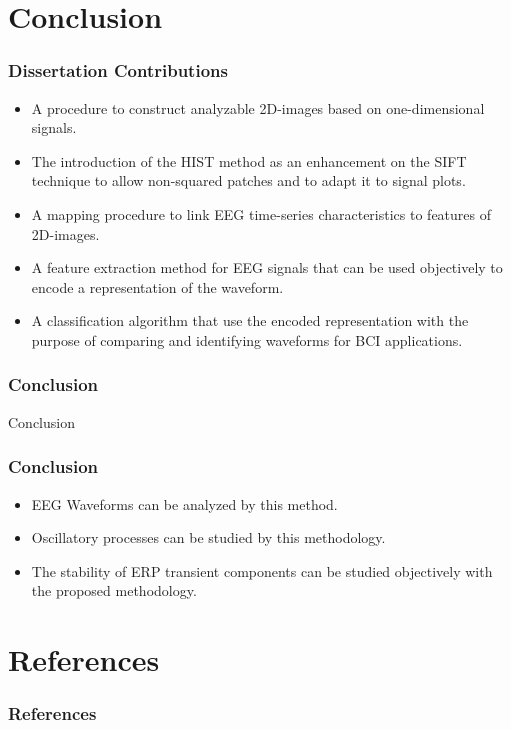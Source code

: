 \documentclass[aspectratio=169]{beamer}
\begin{document}
    \section{Conclusion}
    \begin{frame}
        \frametitle{Dissertation Contributions}
        \begin{center}
            \begin{itemize}
                \item A procedure to construct analyzable 2D-images based on one-dimensional signals.
                \item The introduction of the HIST method as an enhancement on the SIFT technique to allow non-squared patches and to adapt it to signal plots.
                \item A mapping procedure to link EEG time-series characteristics to features of 2D-images.
                \item A feature extraction method for EEG signals that can be used objectively to encode a representation of the waveform.
                \item A classification algorithm that use the encoded representation with the purpose of comparing and identifying waveforms for BCI applications.
            \end{itemize}
        \end{center}
    \end{frame}    


\begin{frame}
\frametitle{Conclusion}
\begin{center}
\LARGE Conclusion
\end{center}
\end{frame}
    
\begin{frame}
\frametitle{Conclusion}
\begin{center}
\begin{itemize}
\item EEG Waveforms can be analyzed by this method.
\item Oscillatory processes can be studied by this methodology.
\item The stability of ERP transient components can be studied objectively with the proposed methodology.
\end{itemize}
\end{center}
\end{frame}    
    
    
    \section{References}
    \begin{frame} %
        \frametitle{References}

    \end{frame}
    
\end{document}
